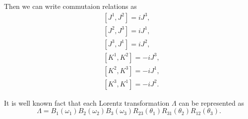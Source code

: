 \documentclass[main.tex]{subfiles}
\begin{document}
Then we can write commutaion relations as
\begin{align}
& [J^1, J^2] = i J^3,\\
& [J^2, J^3] = i J^1,\\
& [J^3, J^1] = i J^2,\\
& [K^1, K^2] = - i J^3,\\
& [K^2, K^3] = - i J^1,\\
& [K^3, K^1] = - i J^2.
\end{align}

It is well known fact that each Lorentz transformation $\Lambda$ can be represented as
\begin{equation}
\Lambda = B_1(\omega_1)B_2(\omega_2)B_3(\omega_3)R_{23}(\theta_1)R_{31}(\theta_2)R_{12}(\theta_3).
\end{equation}
\end{document}
